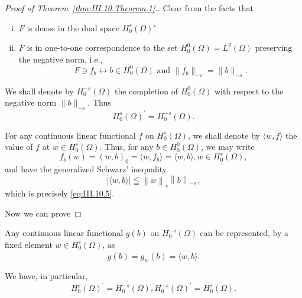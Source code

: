 \begin{proof}[Proof of Theorem~\ref{thm:III.10.Theorem.1}.]
Clear from the facts that \begin{enumerate}[i)]
\item $F$ is dense in the dual space $H_{0}^{s}(\Omega)'$
\item $F$ is in one-to-one correspondence to the set $H_{0}^{0}(\Omega)=L^{2}(\Omega)$ preserving the negative norm, i.e.,
\[
F \ni f _{b} \leftrightarrow b \in H _{0} ^{0} (\Omega) \text{ and } \| f _{b} \| _{-s} = \| b \| _{-s}.
\]
\end{enumerate}


We shall denote by $H_0^{-s}(\Omega)$ the completion of $H_0^0 (\Omega)$ with respect to the negative norm $\|b\|_{-s}$. Thus 
\begin{equation}\label{eq:III.10.7}
H _{0} ^{s} (\Omega) ^{\prime} = H _{0} ^{-s} (\Omega).
\end{equation}

For any continuous linear functional $f$ on $H_0^s(\Omega)$, we shall denote by $\langle w, f \rangle$ the value of $f$ at $w \in H_0^s(\Omega)$. Thus, for any $b \in H_0^0(\Omega)$, we may write 
\begin{equation}\label{eq:III.10.8}
f _{b} (w) = (w, b) _{0} = \langle w, f _{b} \rangle = \langle w, b \rangle , w \in H _{0} ^{s} (\Omega),
\end{equation}
and have the generalized Schwarz' inequality 
\begin{equation}\label{eq:III.10.9}
\left| \langle w, b \rangle \right| \leqq \left\| w \right\| _{s} \left\| b \right\| _{-s},
\end{equation}
which is precisely \eqref{eq:III.10.5}. 

Now we can prove 
\end{proof}

\begin{theorem}\label{thm:III.10.Theorem.2} Any continuous linear functional $g(b)$ on $H_0^{-s}(\Omega)$ can be represented, by a fixed element $w \in H_0^s(\Omega)$, as 
\begin{equation}\label{eq:III.10.10}
g (b) = g _{w} (b) = \overline {{\langle w , b \rangle}}.
\end{equation}
\end{theorem}

We have, in particular, 
\begin{equation}\label{eq:III.10.11}
H _{0} ^{s} (\Omega) ^{\prime} = H _{0} ^{-s} (\Omega), H _{0} ^{-s} (\Omega) ^{\prime} = H _{0} ^{s} (\Omega).
\end{equation}



